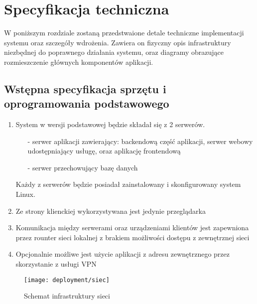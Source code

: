 \section{Specyfikacja techniczna}
W poniższym rozdziale zostaną przedstwaione detale techniczne implementacji systemu oraz szczegóły wdrożenia. Zawiera on fizyczny opis infrastruktury niezbędnej do poprawnego działania systemu, oraz diagramy obrazujące rozmieszczenie głównych komponentów aplikacji.
\subsection{Wstępna specyfikacja sprzętu i oprogramowania podstawowego}
\begin{enumerate}
	\item System w wersji podstawowej będzie składał się z 2 serwerów.
	\begin{itemize}
		\item[-] serwer aplikacji zawierający: backendową część aplikacji, serwer webowy udostępniający usługę, oraz aplikację frontendową
		\item[-] serwer przechowujący bazę danych
	\end{itemize}
Każdy z serwerów będzie posiadał zainstalowany i skonfigurowany system Linux.
	\item Ze strony klienckiej wykorzystywana jest jedynie przeglądarka
	\item Komunikacja między serwerami oraz urządzeniami klientów jest zapewniona przez rounter sieci lokalnej z brakiem możliwości dostępu z zewnętrznej sieci
	\item Opcjonalnie możliwe jest użycie aplikacji z adresu zewnętrznego przez skorzystanie z usługi VPN 
\end{enumerate}

\begin{figure}[H]
    \centering
	\texttt{[image: deployment/siec]}
    \caption{Schemat infrastruktury sieci}
    \label{fig:Deploymentdiagram1}
\end{figure}



